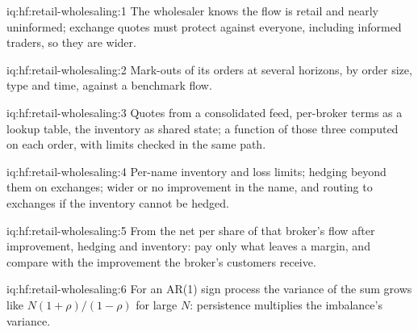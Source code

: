 \begin{solution}{iq:hf:retail-wholesaling:1}
The wholesaler knows the flow is retail and nearly uninformed; exchange quotes must protect against everyone, including informed traders, so they are
wider.
\end{solution}

\begin{solution}{iq:hf:retail-wholesaling:2}
Mark-outs of its orders at several horizons, by order size, type and time, against a benchmark flow.
\end{solution}

\begin{solution}{iq:hf:retail-wholesaling:3}
Quotes from a consolidated feed, per-broker terms as a lookup table, the inventory as shared state; a function of those three computed on each order,
with limits checked in the same path.
\end{solution}

\begin{solution}{iq:hf:retail-wholesaling:4}
Per-name inventory and loss limits; hedging beyond them on exchanges; wider or no improvement in the name, and routing to exchanges if the
inventory cannot be hedged.
\end{solution}

\begin{solution}{iq:hf:retail-wholesaling:5}
From the net per share of that broker's flow after improvement, hedging and inventory: pay only what leaves a margin, and compare with the
improvement the broker's customers receive.
\end{solution}

\begin{solution}{iq:hf:retail-wholesaling:6}
For an AR(1) sign process the variance of the sum grows like $N(1+\rho)/(1-\rho)$ for large $N$: persistence multiplies the imbalance's variance.
\end{solution}
